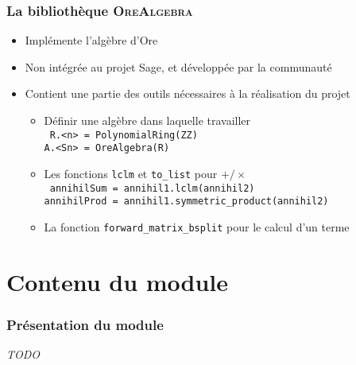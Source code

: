 \documentclass{beamer}
\begin{document}
\begin{frame}
\frametitle{La bibliothèque \textsc{OreAlgebra}}
\begin{center}
\begin{itemize}
    \item Implémente l'algèbre d'Ore
    \item Non intégrée au projet Sage, et développée par la communauté
    \item Contient une partie des outils nécessaires à la réalisation du projet
        \begin{itemize}
            \item Définir une algèbre dans laquelle travailler\\
                \texttt{
                    R.<n> = PolynomialRing(ZZ)\\
                    \hspace{1.3ex}A.<Sn> = OreAlgebra(R)
                }
            \item Les fonctions \texttt{lclm} et \texttt{to\_list} pour $+/\times$\\
                \texttt{
                    annihilSum = annihil1.lclm(annihil2)\\
                    \hspace{1.3ex}annihilProd = annihil1.symmetric\_product(annihil2)
                }
            \item La fonction \texttt{forward\_matrix\_bsplit} pour le calcul d'un terme
    \end{itemize}
\end{itemize}
\end{center}
\end{frame}

\section{Contenu du module}%

\begin{frame}
\frametitle{Présentation du module}
\begin{center}
\emph{TODO}
\end{center}
\end{frame}
\end{document}
